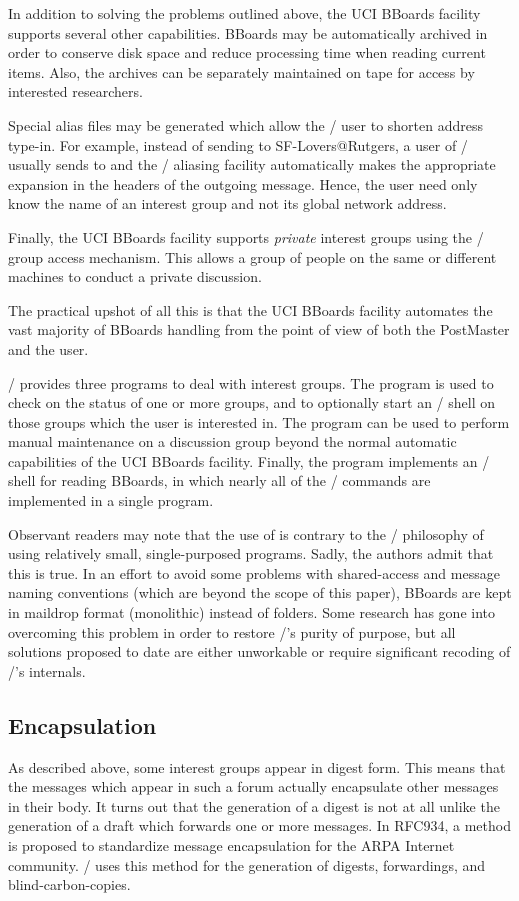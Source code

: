 In addition to solving the problems outlined above,
the UCI BBoards facility supports several other capabilities.
BBoards may be automatically archived in order to conserve disk space and
reduce processing time when reading current items.
Also,
the archives can be separately maintained on tape for access by interested
researchers.

Special alias files may be generated which allow the \MH/ user to shorten
address type-in.
For example, instead of sending to {\tx SF-Lovers@Rutgers},
a user of \MH/ usually sends to  and the \MH/ aliasing
facility automatically makes the appropriate expansion in the headers of the
outgoing message.
Hence,
the user need only know the name of an interest group and not its global
network address.

Finally, the UCI BBoards facility supports {\it private} interest groups
using the \unix/ group access mechanism.
This allows a group of people on the same or different machines to conduct a
private discussion.

The practical upshot of all this is that the UCI BBoards facility automates
the vast majority of BBoards handling from the point of view of both the
PostMaster and the user.

\MH/ provides three programs to deal with interest groups.
The  program is used to check on the status of one or more groups,
and to optionally start an \MH/ shell on those groups which the user is
interested in.
The  program can be used to perform manual maintenance on a
discussion group beyond the normal automatic capabilities of the UCI BBoards
facility.
Finally,
the  program implements an \MH/ shell for reading BBoards,
in which nearly all of the \MH/ commands are implemented in a single program.

Observant readers may note that the use of  is contrary to the \MH/
philosophy of using relatively small, single-purposed programs.
Sadly,
the authors admit that this is true.
In an effort to avoid some problems with shared-access and message naming
conventions (which are beyond the scope of this paper),
BBoards are kept in maildrop format (monolithic) instead of folders.
Some research has gone into overcoming this problem in order to restore
\MH/'s purity of purpose,
but all solutions proposed to date are either unworkable or require
significant recoding of \MH/'s internals.

\subsection{Encapsulation}			%
As described above,
some interest groups appear in digest form.
This means that the messages which appear in such a forum actually
encapsulate other messages in their body.
It turns out that the generation of a digest is not at all unlike the
generation of a draft which forwards one or more messages.
In RFC934\cite{MRose85b},
a method is proposed to standardize message encapsulation for the ARPA
Internet community.
\MH/ uses this method for the generation of digests,
forwardings,
and blind-carbon-copies.

